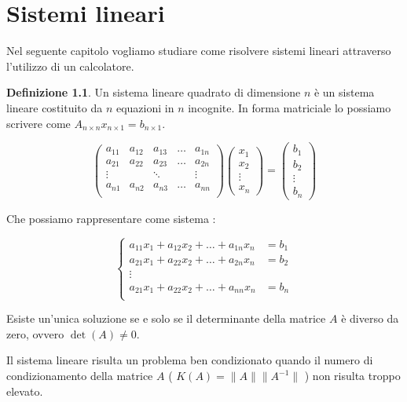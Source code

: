 \documentclass[12pt, a4paper]{book}
\theoremstyle{definition}
\newtheorem{defn}{Definizione}[section]
\begin{document}
\chapter{Sistemi lineari}
\begin{flushleft}
Nel seguente capitolo vogliamo studiare come risolvere sistemi lineari attraverso l'utilizzo di un calcolatore.
\begin{defn}
	Un sistema lineare quadrato di dimensione $n$ è un sistema lineare costituito da $n$ equazioni in $n$ incognite.  In forma matriciale lo possiamo scrivere come $A_{n \times n} x_{n \times 1} = b_{n \times 1}$.
	
	\[ 
		\begin{pmatrix}
			a_{11} & a_{12} & a_{13} & \dots & a_{1n} \\
			a_{21} & a_{22} & a_{23} & \dots & a_{2n} \\
			\vdots & & \ddots & & \vdots \\
			a_{n1} & a_{n2} & a_{n3} & \dots & a_{nn} \\
		\end{pmatrix}	
		\begin{pmatrix}
			x_{1}  \\
			x_{2}  \\
			\vdots  \\
			x_{n}
		\end{pmatrix}
		= 
		\begin{pmatrix}
			b_{1}  \\
			b_{2}  \\
			\vdots  \\
			b_{n}
		\end{pmatrix}		
	\]

Che possiamo rappresentare come sistema : 

	\[ 
			\begin{cases}
  				a_{11}x_{1} + a_{12}x_{2}  + \dots + a_{1n}x_{n} &= b_{1} \\
       			a_{21}x_{1} + a_{22}x_{2}  + \dots + a_{2n}x_{n} &= b_{2} \\
       			\vdots \\
  				a_{21}x_{1} + a_{22}x_{2}  + \dots + a_{nn}x_{n} &= b_{n} \\
			\end{cases}
	\]

Esiste un'unica soluzione se e solo se il determinante della matrice $A$ è diverso da zero, ovvero $\det(A) \neq 0$.
\end{defn}

Il sistema lineare risulta un problema ben condizionato quando il numero di condizionamento della matrice $A$ ( $K(A) = \lVert A \rVert \lVert A^{-1} \rVert$ ) non risulta troppo elevato.
\end{flushleft}
\end{document}
